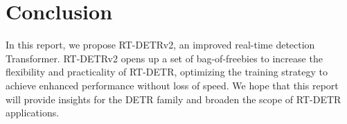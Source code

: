 \documentclass{article}
\begin{document}
\section{Conclusion}
In this report, we propose RT-DETRv2, an improved real-time detection Transformer.
RT-DETRv2 opens up a set of bag-of-freebies to increase the flexibility and practicality of RT-DETR, optimizing the training strategy to achieve enhanced performance without loss of speed.
We hope that this report will provide insights for the DETR family and broaden the scope of RT-DETR applications.

{
    
    
}
\end{document}
